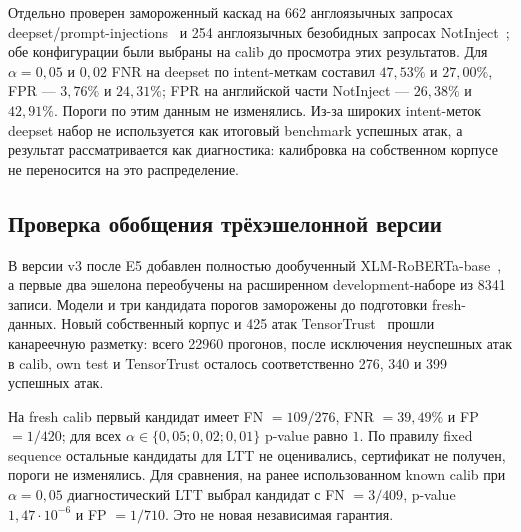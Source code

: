 \documentclass{misisarticle}
\begin{document}
\begin{table}[t]
  \caption{Диагностика на внешнем наборе с intent-разметкой}
  \label{tab:external}
  \centering
\end{table}

Отдельно проверен замороженный каскад на 662 англоязычных запросах deepset/prompt-injections~\cite{deepset} и 254 англоязычных безобидных запросах NotInject~\cite{li2025piguard}; обе конфигурации были выбраны на calib до просмотра этих результатов. Для $\alpha=0{,}05$ и $0{,}02$ FNR на deepset по intent-меткам составил $47{,}53\%$ и $27{,}00\%$, FPR --- $3{,}76\%$ и $24{,}31\%$; FPR на английской части NotInject --- $26{,}38\%$ и $42{,}91\%$. Пороги по этим данным не изменялись. Из-за широких intent-меток deepset набор не используется как итоговый benchmark успешных атак, а результат рассматривается как диагностика: калибровка на собственном корпусе не переносится на это распределение.

\subsection{Проверка обобщения трёхэшелонной версии}

В версии v3 после E5 добавлен полностью дообученный XLM-RoBERTa-base~\cite{xlmr}, а первые два эшелона переобучены на расширенном development-наборе из 8341 записи. Модели и три кандидата порогов заморожены до подготовки fresh-данных. Новый собственный корпус и 425 атак TensorTrust~\cite{tensortrust} прошли канареечную разметку: всего 22960 прогонов, после исключения неуспешных атак в calib, own test и TensorTrust осталось соответственно 276, 340 и 399 успешных атак.

На fresh calib первый кандидат имеет FN $=109/276$, FNR $=39{,}49\%$ и FP $=1/420$; для всех $\alpha\in\{0{,}05;0{,}02;0{,}01\}$ p-value равно $1$. По правилу fixed sequence остальные кандидаты для LTT не оценивались, сертификат не получен, пороги не изменялись. Для сравнения, на ранее использованном known calib при $\alpha=0{,}05$ диагностический LTT выбрал кандидат с FN $=3/409$, p-value $1{,}47\cdot10^{-6}$ и FP $=1/710$. Это не новая независимая гарантия.
\end{document}
